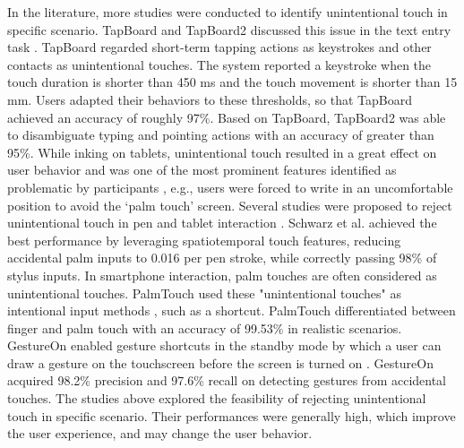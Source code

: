 In the literature, more studies were conducted to identify unintentional touch in specific scenario. TapBoard and TapBoard2 discussed this issue in the text entry task \cite{2013-TapBoard,2016-TapBoard2}. TapBoard regarded short-term tapping actions as keystrokes and other contacts as unintentional touches. The system reported a keystroke when the touch duration is shorter than 450 ms and the touch movement is shorter than 15 mm. Users adapted their behaviors to these thresholds, so that TapBoard achieved an accuracy of roughly 97\%. Based on TapBoard, TapBoard2 was able to disambiguate typing and pointing actions with an accuracy of greater than 95\%.
While inking on tablets, unintentional touch resulted in a great effect on user behavior and was one of the most prominent features identified as problematic by participants \cite{2014-PenMightier}, e.g., users were forced to write in an uncomfortable position to avoid the ‘palm touch’ screen. Several studies were proposed to reject unintentional touch in pen and tablet interaction \cite{2013-PalmInput,2014-PenUnint,2014-PalmRejection}. Schwarz et al. achieved the best performance \cite{2014-PalmRejection} by leveraging spatiotemporal touch features, reducing accidental palm inputs to 0.016 per pen stroke, while correctly passing 98\% of stylus inputs.
In smartphone interaction, palm touches are often considered as unintentional touches. PalmTouch used these "unintentional touches" as intentional input methods \cite{2018-PalmTouch}, such as a shortcut. PalmTouch differentiated between finger and palm touch with an accuracy of 99.53\% in realistic scenarios. GestureOn enabled gesture shortcuts in the standby mode by which a user can draw a gesture on the touchscreen before the screen is turned on \cite{2015-GestureOn}. GestureOn acquired 98.2\% precision and 97.6\% recall on detecting gestures from accidental touches.
The studies above explored the feasibility of rejecting unintentional touch in specific scenario. Their performances were generally high, which improve the user experience, and may change the user behavior.



